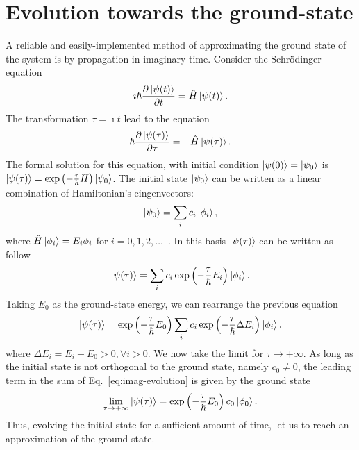 \section{Evolution towards the ground-state}
A reliable and easily-implemented method of approximating the ground state of the
system is by propagation in imaginary time. Consider the Schr\"odinger equation
\begin{equation}
\imath \hbar \frac{\partial \ket{\psi(t)}}{\partial t} = \hat{H} \ket{\psi(t)}.
\end{equation}
The transformation $ \tau = \imath t$ lead to the equation
\begin{equation}
\hbar \frac{\partial \ket{\psi(\tau)}}{\partial \tau} = - \hat{H} \ket{\psi(\tau)}.
\end{equation}
The formal solution for this equation, with initial condition $\ket{\psi(0)} = \ket{\psi_0}$ is $\ket{\psi(\tau)} = \exp\left( -\frac{\tau}{\hbar} H \right) \ket{\psi_0}$. The initial state $\ket{\psi_0}$ can be written as a linear combination of Hamiltonian's eingenvectors:
\begin{equation}
\ket{\psi_0} = \sum_i c_i \ket{\phi_i},
\end{equation}
where $\hat{H} \ket{\phi_i} = E_i \phi_i$ for $i = 0,1,2,\ldots$~. In this basis $\ket{\psi(\tau)}$ can be written as follow
\begin{equation}
\ket{\psi(\tau)} = \sum_i c_i \exp\left( -\frac{\tau}{\hbar} E_i \right) \ket{\phi_i}.
\end{equation}
Taking $E_0$ as the ground-state energy, we can rearrange the previous equation
\begin{equation} \label{eq:imag-evolution}
\ket{\psi(\tau)} = \exp \left( -\frac{\tau}{\hbar} E_0 \right) \sum_i c_i  \exp\left( -\frac{\tau}{\hbar} \Delta E_i \right) \ket{\phi_i}.
\end{equation}
where $\Delta E_i = E_i - E_0 > 0,  \forall i > 0$. We now take the limit for $\tau \rightarrow +\infty$. As long as the initial state is not orthogonal to the ground state, namely $c_0 \neq 0$, the leading term in the sum of Eq.~\eqref{eq:imag-evolution} is given by the ground state
\begin{equation}
\lim_{\tau \rightarrow +\infty} \ket{\psi(\tau)} = \exp \left( -\frac{\tau}{\hbar} E_0 \right) c_0 \ket{\phi_0}.
\end{equation}
Thus, evolving the initial state for a sufficient amount of time, let us to reach an  approximation of the ground state.


